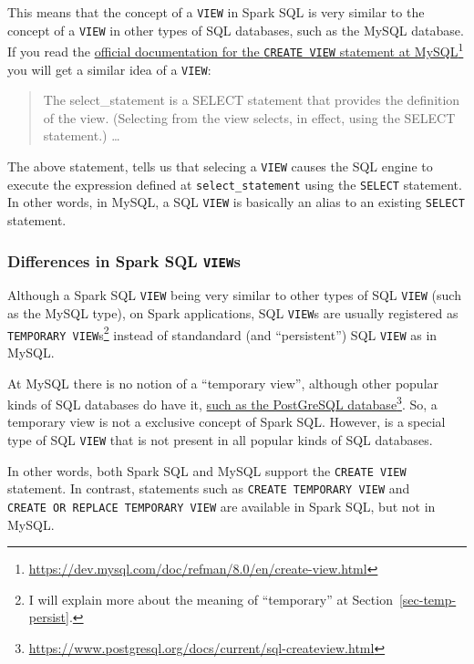 \documentclass[
  11pt,
  letterpaper,
  DIV=11,
  numbers=noendperiod]{scrreprt}
\begin{document}
This means that the concept of a \texttt{VIEW} in Spark SQL is very
similar to the concept of a \texttt{VIEW} in other types of SQL
databases, such as the MySQL database. If you read the
\href{https://dev.mysql.com/doc/refman/8.0/en/create-view.html}{official
documentation for the \texttt{CREATE\ VIEW} statement at
MySQL}\footnote{\url{https://dev.mysql.com/doc/refman/8.0/en/create-view.html}}
you will get a similar idea of a \texttt{VIEW}:

\begin{quote}
The select\_statement is a SELECT statement that provides the definition
of the view. (Selecting from the view selects, in effect, using the
SELECT statement.) \ldots{}
\end{quote}

The above statement, tells us that selecing a \texttt{VIEW} causes the
SQL engine to execute the expression defined at
\texttt{select\_statement} using the \texttt{SELECT} statement. In other
words, in MySQL, a SQL \texttt{VIEW} is basically an alias to an
existing \texttt{SELECT} statement.

\hypertarget{differences-in-spark-sql-views}{%
\subsubsection{\texorpdfstring{Differences in Spark SQL
\texttt{VIEW}s}{Differences in Spark SQL VIEWs}}\label{differences-in-spark-sql-views}}

Although a Spark SQL \texttt{VIEW} being very similar to other types of
SQL \texttt{VIEW} (such as the MySQL type), on Spark applications, SQL
\texttt{VIEW}s are usually registered as
\texttt{TEMPORARY\ VIEW}s\footnote{I will explain more about the meaning
  of ``temporary'' at Section~\ref{sec-temp-persist}.} instead of
standandard (and ``persistent'') SQL \texttt{VIEW} as in MySQL.

At MySQL there is no notion of a ``temporary view'', although other
popular kinds of SQL databases do have it,
\href{https://www.postgresql.org/docs/current/sql-createview.html}{such
as the PostGreSQL database}\footnote{\url{https://www.postgresql.org/docs/current/sql-createview.html}}.
So, a temporary view is not a exclusive concept of Spark SQL. However,
is a special type of SQL \texttt{VIEW} that is not present in all
popular kinds of SQL databases.

In other words, both Spark SQL and MySQL support the
\texttt{CREATE\ VIEW} statement. In contrast, statements such as
\texttt{CREATE\ TEMPORARY\ VIEW} and
\texttt{CREATE\ OR\ REPLACE\ TEMPORARY\ VIEW} are available in Spark
SQL, but not in MySQL.
\end{document}
